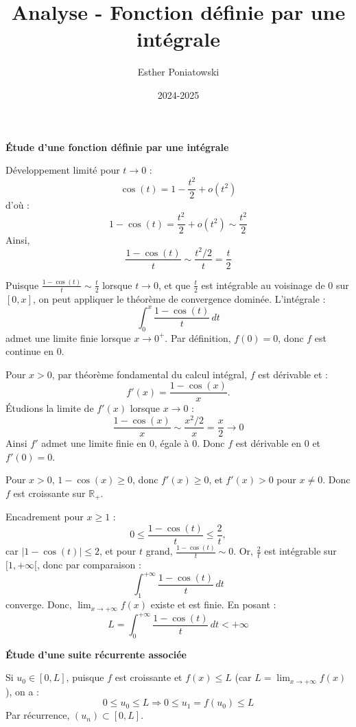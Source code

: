 \documentclass[10pt,a4paper]{article}
\title{Analyse - Fonction définie par une intégrale}
\author{Esther Poniatowski}
\date{2024-2025}
\begin{document}
\vspace{0.5cm}
\textbf{Étude d'une fonction définie par une intégrale}

\q Développement limité pour \( t \to 0 \) :
\[
\cos(t) = 1 - \frac{t^2}{2} + o(t^2)
\]
d'où :
\[
1 - \cos(t) = \frac{t^2}{2} + o(t^2) \sim \frac{t^2}{2}
\]
Ainsi,
\[
\frac{1 - \cos(t)}{t} \sim \frac{t^2/2}{t} = \frac{t}{2}
\]

\q Puisque \( \frac{1 - \cos(t)}{t} \sim \frac{t}{2} \) lorsque \( t \to 0 \), et que \( \frac{t}{2}
\) est intégrable au voisinage de 0 sur \( [0, x] \), on peut appliquer le théorème de convergence
dominée. L'intégrale :
\[
\int_0^x \frac{1 - \cos(t)}{t} \, dt
\]
admet une limite finie lorsque \( x \to 0^+ \). Par définition, \( f(0) = 0 \), donc \( f \) est
continue en 0.

\q Pour \( x > 0 \), par théorème fondamental du calcul intégral, \( f \) est dérivable et :
\[
f'(x) = \frac{1 - \cos(x)}{x}.
\]
Étudions la limite de \( f'(x) \) lorsque \( x \to 0 \) :
\[
\frac{1 - \cos(x)}{x} \sim \frac{x^2/2}{x} = \frac{x}{2} \to 0
\]
Ainsi \( f' \) admet une limite finie en 0, égale à 0.
Donc \( f \) est dérivable en 0 et \( f'(0) = 0 \).

\q Pour \( x > 0 \), \( 1 - \cos(x) \geq 0 \), donc \( f'(x) \geq 0 \), et \( f'(x) > 0 \) pour \( x
\neq 0 \). Donc \( f \) est croissante sur \( \mathbb{R}_+ \).

\q Encadrement pour \( x \geq 1 \) :
\[
0 \leq \frac{1 - \cos(t)}{t} \leq \frac{2}{t},
\]
car \( |1 - \cos(t)| \leq 2 \), et pour \( t \) grand, \( \frac{1 - \cos(t)}{t} \sim 0 \).
Or, \( \frac{2}{t} \) est intégrable sur \( [1, +\infty[ \), donc par comparaison :
\[
\int_1^{+\infty} \frac{1 - \cos(t)}{t} \, dt
\]
converge.
Donc, \( \displaystyle \lim_{x \to +\infty} f(x) \) existe et est finie. En posant :
\[
L = \int_0^{+\infty} \frac{1 - \cos(t)}{t} \, dt < +\infty
\]

\bigskip
\textbf{Étude d'une suite récurrente associée}

\q Si \( u_0 \in [0, L] \), puisque \( f \) est croissante et \( f(x) \leq L \) (car \( L = \lim_{x
\to +\infty} f(x) \)), on a :
\[
0 \leq u_0 \leq L \Rightarrow 0 \leq u_1 = f(u_0) \leq L
\]
Par récurrence, \( (u_n) \subset [0, L] \).
\end{document}
